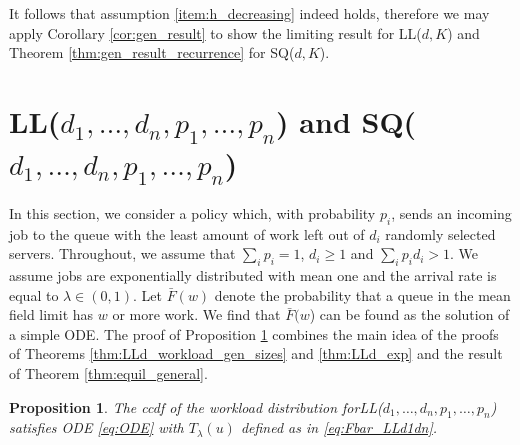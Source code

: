 \documentclass[12pt]{report}
\newtheorem{proposition}[theorem]{Proposition}
\begin{document}
It follows that assumption \ref{item:h_decreasing} indeed holds, therefore we may apply Corollary \ref{cor:gen_result} to show the limiting result for LL($d,K$) and Theorem \ref{thm:gen_result_recurrence} for SQ($d,K$).

\section{LL($d_1,\dots, d_n, p_1,\dots, p_n$) and \newline SQ($d_1,\dots, d_n, p_1,\dots, p_n$)} \label{sec:l1ld}
In this section, we consider a policy which, with probability $p_i$, sends an incoming job to the queue with the least amount of work left out of $d_i$ randomly selected servers. Throughout, we assume that $\sum_{i}p_i=1$, $d_i\geq 1$ and $\sum_i p_i d_i > 1$. We assume jobs are exponentially distributed with mean one and the arrival rate is equal to $\lambda \in (0,1)$. Let $\bar F(w)$ denote the probability that a queue in the mean field limit has $w$ or more work. We find that $\bar F(w$) can be found as the solution of a simple ODE. The proof of Proposition \ref{prop:LLd1dn_F} combines the main idea of the proofs of Theorems \ref{thm:LLd_workload_gen_sizes} and \ref{thm:LLd_exp} and the result of Theorem \ref{thm:equil_general}.
\begin{proposition}\label{prop:LLd1dn_F}
The ccdf of the workload distribution for\newline LL($d_1,\dots,d_n,p_1,\dots,p_n$) satisfies ODE \eqref{eq:ODE} with $T_\lambda(u)$ defined as in \eqref{eq:Fbar_LLd1dn}. 
\end{proposition}
\end{document}
